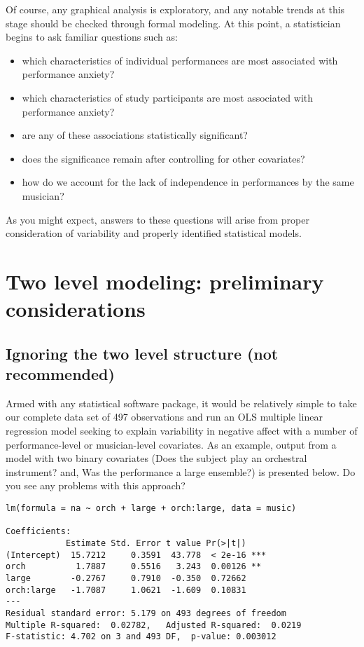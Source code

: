 \documentclass[
]{krantz}
\providecommand{\tightlist}{%
  \setlength{\itemsep}{0pt}\setlength{\parskip}{0pt}}
\begin{document}
Of course, any graphical analysis is exploratory, and any notable trends at this stage should be checked through formal modeling. At this point, a statistician begins to ask familiar questions such as:

\begin{itemize}
\tightlist
\item
  which characteristics of individual performances are most associated with performance anxiety?
\item
  which characteristics of study participants are most associated with performance anxiety?
\item
  are any of these associations statistically significant?
\item
  does the significance remain after controlling for other covariates?
\item
  how do we account for the lack of independence in performances by the same musician?
\end{itemize}

As you might expect, answers to these questions will arise from proper consideration of variability and properly identified statistical models.

\hypertarget{twolevelmodeling}{%
\section{Two level modeling: preliminary considerations}\label{twolevelmodeling}}

\hypertarget{multregr}{%
\subsection{Ignoring the two level structure (not recommended)}\label{multregr}}

Armed with any statistical software package, it would be relatively simple to take our complete data set of 497 observations and run an OLS multiple linear regression model seeking to explain variability in negative affect with a number of performance-level or musician-level covariates. As an example, output from a model with two binary covariates (Does the subject play an orchestral instrument? and, Was the performance a large ensemble?) is presented below. Do you see any problems with this approach?

\begin{verbatim}
lm(formula = na ~ orch + large + orch:large, data = music)

Coefficients:
            Estimate Std. Error t value Pr(>|t|)    
(Intercept)  15.7212     0.3591  43.778  < 2e-16 ***
orch          1.7887     0.5516   3.243  0.00126 ** 
large        -0.2767     0.7910  -0.350  0.72662    
orch:large   -1.7087     1.0621  -1.609  0.10831    
---
Residual standard error: 5.179 on 493 degrees of freedom
Multiple R-squared:  0.02782,   Adjusted R-squared:  0.0219 
F-statistic: 4.702 on 3 and 493 DF,  p-value: 0.003012
\end{verbatim}
\end{document}
